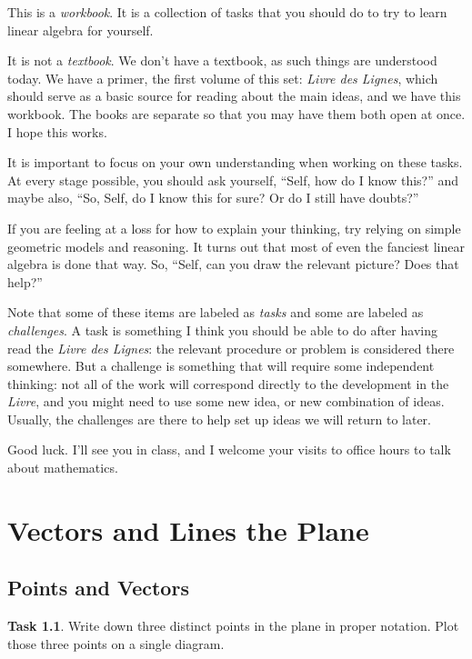 \documentclass{tufte-book}
\theoremstyle{definition}
\newtheorem{task}{Task}
\begin{document}
This is a \emph{workbook}. 
It is a collection of tasks that you should do to try to learn linear algebra for yourself.

It is not a \emph{textbook}. We don't have a textbook, as such things are understood today. We have a primer, the first volume of this set: \emph{Livre des Lignes}, which
should serve as a basic source for reading about the main ideas, and we have this workbook. The books are separate so that you may have them both open at once. I hope this works.


It is important to focus on your own understanding when working on these tasks. At every stage possible, you should ask yourself, ``Self, how do I know this?'' and maybe also, ``So, Self, do I know this for sure? Or do I still have doubts?''

If you are feeling at a loss for how to explain your thinking, try relying on simple geometric models and reasoning. It turns out that most of even the fanciest linear algebra is done that way. So, ``Self, can you draw the relevant picture? Does that help?''

Note that some of these items are labeled as \emph{tasks} and some are labeled as \emph{challenges}. A task is something I think you should be able to do after having read the \emph{Livre des Lignes}: the relevant procedure or problem is considered there somewhere. But a challenge is something that will require some independent thinking: not all of the work will correspond directly to the development in the \emph{Livre}, and you might need to use some new idea, or new combination of ideas. Usually, the challenges are there to help set up ideas we will return to later.


Good luck. I'll see you in class, and I welcome your visits to office hours to talk about mathematics.


\mainmatter

\chapter{Vectors and Lines the Plane}
\label{ch:one}

\section*{Points and Vectors}

\begin{task}
Write down three distinct points in the plane in proper notation. 
Plot those three points on a single diagram.
\end{task}
\end{document}

